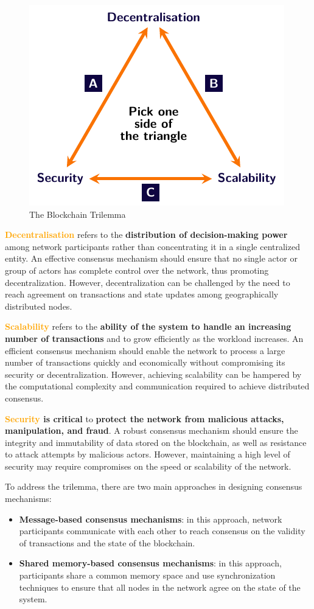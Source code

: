 \begin{figure}[!htbp]
\centering
\includegraphics[width=0.6\linewidth]{tikz/chapter3 - Trilemma.pdf}
\caption{The Blockchain Trilemma}
\end{figure}

\textbf{\textcolor{Orange}{Decentralisation}} refers to the \textbf{distribution of decision-making power} among network participants rather than concentrating it in a single centralized entity. An effective consensus mechanism should ensure that no single actor or group of actors has complete control over the network, thus promoting decentralization. However, decentralization can be challenged by the need to reach agreement on transactions and state updates among geographically distributed nodes.

\textbf{\textcolor{Orange}{Scalability}} refers to the \textbf{ability of the system to handle an increasing number of transactions} and to grow efficiently as the workload increases. An efficient consensus mechanism should enable the network to process a large number of transactions quickly and economically without compromising its security or decentralization. However, achieving scalability can be hampered by the computational complexity and communication required to achieve distributed consensus.

\textbf{\textcolor{Orange}{Security} is critical} to \textbf{protect the network from malicious attacks, manipulation, and fraud}. A robust consensus mechanism should ensure the integrity and immutability of data stored on the blockchain, as well as resistance to attack attempts by malicious actors. However, maintaining a high level of security may require compromises on the speed or scalability of the network.

To address the trilemma, there are two main approaches in designing consensus mechanisms:
\begin{itemize}
    \item \textbf{Message-based consensus mechanisms}: in this approach, network participants communicate with each other to reach consensus on the validity of transactions and the state of the blockchain. 
    \item \textbf{Shared memory-based consensus mechanisms}: in this approach, participants share a common memory space and use synchronization techniques to ensure that all nodes in the network agree on the state of the system. 
\end{itemize}

